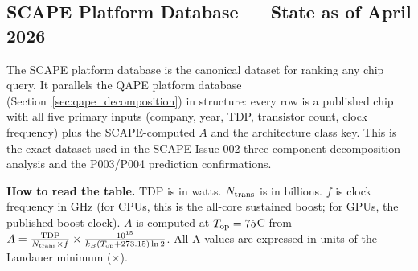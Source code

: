 \documentclass[12pt,a4paper]{article}
\begin{document}
\subsection{SCAPE Platform Database --- State as of April 2026}
\label{subsec:scape_db}

The SCAPE platform database is the canonical dataset for ranking any
chip query. It parallels the QAPE platform database
(Section~\ref{sec:qape_decomposition}) in structure: every row is a
published chip with all five primary inputs (company, year, TDP, transistor
count, clock frequency) plus the SCAPE-computed $A$ and the architecture
class key. This is the exact dataset used in the SCAPE Issue 002
three-component decomposition analysis and the P003/P004 prediction
confirmations.

\textbf{How to read the table.} TDP is in watts. $N_{\rm trans}$ is in
billions. $f$ is clock frequency in GHz (for CPUs, this is the all-core
sustained boost; for GPUs, the published boost clock).
$A$ is computed at $T_{\rm op} = 75$\textdegree C from
$A = \frac{\rm TDP}{N_{\rm trans} \times f} \times \frac{10^{15}}{k_B(T_{\rm op}+273.15)\ln 2}$.
All A values are expressed in units of the Landauer minimum ($\times$).
\end{document}
